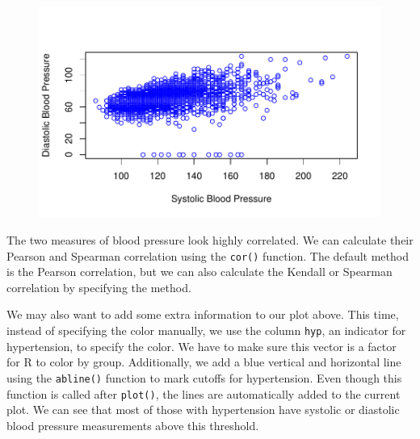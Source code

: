 \documentclass[
  letterpaper,
]{krantz}
\makeatletter
\newenvironment{Shaded}{\begin{snugshade}}{\end{snugshade}}
\newcommand{\AttributeTok}[1]{\textcolor[rgb]{0.40,0.45,0.13}{#1}}
\newcommand{\CommentTok}[1]{\textcolor[rgb]{0.37,0.37,0.37}{#1}}
\newcommand{\FunctionTok}[1]{\textcolor[rgb]{0.28,0.35,0.67}{#1}}
\newcommand{\NormalTok}[1]{\textcolor[rgb]{0.00,0.23,0.31}{#1}}
\newcommand{\SpecialCharTok}[1]{\textcolor[rgb]{0.37,0.37,0.37}{#1}}
\newcommand{\StringTok}[1]{\textcolor[rgb]{0.13,0.47,0.30}{#1}}
\newenvironment{kframe}{%
\medskip{}
\setlength{\fboxsep}{.8em}
 \def\at@end@of@kframe{}%
 \ifinner\ifhmode%
  \def\at@end@of@kframe{\end{minipage}}%
  \begin{minipage}{\columnwidth}%
 \fi\fi%
 \def\FrameCommand##1{\hskip\@totalleftmargin \hskip-\fboxsep
 \colorbox{shadecolor}{##1}\hskip-\fboxsep
     \hskip-\linewidth \hskip-\@totalleftmargin \hskip\columnwidth}%
 \MakeFramed {\advance\hsize-\width
   \@totalleftmargin\z@ \linewidth\hsize
   \@setminipage}}%
 {\par\unskip\endMakeFramed%
 \at@end@of@kframe}
\renewenvironment{Shaded}{\begin{kframe}}{\end{kframe}}
\makeatother
\begin{document}
\begin{figure}[H]

{\centering \includegraphics[width=1\textwidth,height=\textheight]{book/4_exploratory_analysis_files/figure-pdf/unnamed-chunk-17-1.pdf}

}

\end{figure}

The two measures of blood pressure look highly correlated. We can
calculate their Pearson and Spearman correlation using the
\texttt{cor()} function. The default method is the Pearson correlation,
but we can also calculate the Kendall or Spearman correlation by
specifying the method.

\begin{Shaded}
\end{Shaded}

We may also want to add some extra information to our plot above. This
time, instead of specifying the color manually, we use the column
\texttt{hyp}, an indicator for hypertension, to specify the color. We
have to make sure this vector is a factor for R to color by group.
Additionally, we add a blue vertical and horizontal line using the
\texttt{abline()} function to mark cutoffs for hypertension. Even though
this function is called after \texttt{plot()}, the lines are
automatically added to the current plot. We can see that most of those
with hypertension have systolic or diastolic blood pressure measurements
above this threshold.
\end{document}
